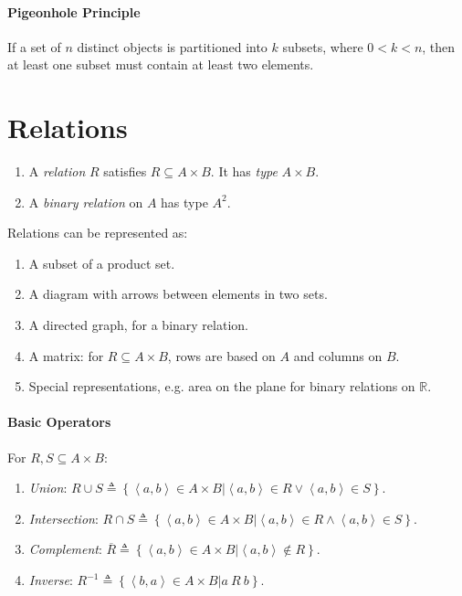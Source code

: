 \documentclass[10pt,twoside,twocolumn]{article}
\newcommand{\R}[0]{\mathds{R}} %
\begin{document}
\paragraph{Pigeonhole Principle}

If a set of $n$ distinct objects is partitioned into $k$ subsets,
where $0<k<n$, then at least one subset must contain at least two
elements.


\section{Relations}
\begin{enumerate}
\item A \emph{relation} $R$ satisfies $R\subseteq A\times B$. It has \emph{type}
$A\times B$. 
\item A \emph{binary relation} on $A$ has type $A^{2}$. 
\end{enumerate}
Relations can be represented as: 
\begin{enumerate}
\item A subset of a product set. 
\item A diagram with arrows between elements in two sets. 
\item A directed graph, for a binary relation. 
\item A matrix: for $R\subseteq A\times B$, rows are based on $A$ and
columns on $B$. 
\item Special representations, e.g. area on the plane for binary relations
on $\R$. 
\end{enumerate}

\paragraph{Basic Operators}

For $R,S\subseteq A\times B$: 
\begin{enumerate}
\item \emph{Union}: $R\cup S\triangleq\left\{ \left\langle a,b\right\rangle \in A\times B|\left\langle a,b\right\rangle \in R\lor\left\langle a,b\right\rangle \in S\right\} $. 
\item \emph{Intersection}: $R\cap S\triangleq\left\{ \left\langle a,b\right\rangle \in A\times B|\left\langle a,b\right\rangle \in R\land\left\langle a,b\right\rangle \in S\right\} $. 
\item \emph{Complement}: $\overline{R}\triangleq\left\{ \left\langle a,b\right\rangle \in A\times B|\left\langle a,b\right\rangle \not\in R\right\} $. 
\item \emph{Inverse}: $R^{-1}\triangleq\left\{ \left\langle b,a\right\rangle \in A\times B|a\:R\:b\right\} $. 
\end{enumerate}
\end{document}
